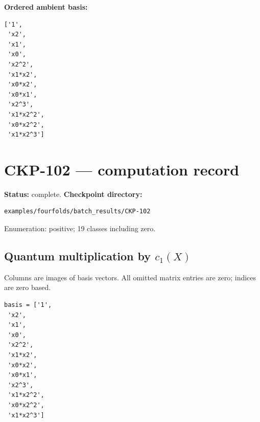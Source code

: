 \documentclass[10pt,a4paper]{article}
\begin{document}
\textbf{Ordered ambient basis:}
\begin{lstlisting}
['1',
 'x2',
 'x1',
 'x0',
 'x2^2',
 'x1*x2',
 'x0*x2',
 'x0*x1',
 'x2^3',
 'x1*x2^2',
 'x0*x2^2',
 'x1*x2^3']
\end{lstlisting}

\clearpage\section*{CKP-102 --- computation record}
\textbf{Status:} complete.
\textbf{Checkpoint directory:}
\begin{lstlisting}
examples/fourfolds/batch_results/CKP-102
\end{lstlisting}

Enumeration: positive; 19 classes including zero.
\subsection*{Quantum multiplication by $c_1(X)$}
Columns are images of basis vectors. All omitted matrix entries are zero; indices are zero based.

\begin{lstlisting}
basis = ['1',
 'x2',
 'x1',
 'x0',
 'x2^2',
 'x1*x2',
 'x0*x2',
 'x0*x1',
 'x2^3',
 'x1*x2^2',
 'x0*x2^2',
 'x1*x2^3']
\end{lstlisting}
\end{document}
